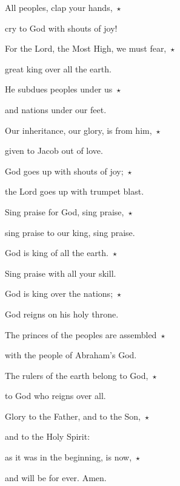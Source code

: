 \noindent All peoples, clap your hands,~$\star$~\nopagebreak

cry to God with shouts of joy!

\noindent For the Lord, the Most High, we must fear,~$\star$~\nopagebreak

great king over all the earth.

\noindent He subdues peoples under us~$\star$~\nopagebreak

and nations under our feet.

\noindent Our inheritance, our glory, is from him,~$\star$~\nopagebreak

given to Jacob out of love.

\noindent God goes up with shouts of joy;~$\star$~\nopagebreak

the Lord goes up with trumpet blast.

\noindent Sing praise for God, sing praise,~$\star$~\nopagebreak

sing praise to our king, sing praise.

\noindent God is king of all the earth.~$\star$~\nopagebreak

Sing praise with all your skill.

\noindent God is king over the nations;~$\star$~\nopagebreak

God reigns on his holy throne.

\noindent The princes of the peoples are assembled~$\star$~\nopagebreak

with the people of Abraham’s God.

\noindent The rulers of the earth belong to God,~$\star$~\nopagebreak

to God who reigns over all.

\noindent Glory to the Father, and to the Son,~$\star$~\nopagebreak

and to the Holy Spirit:

\noindent as it was in the beginning, is now,~$\star$~\nopagebreak

and will be for ever. Amen.